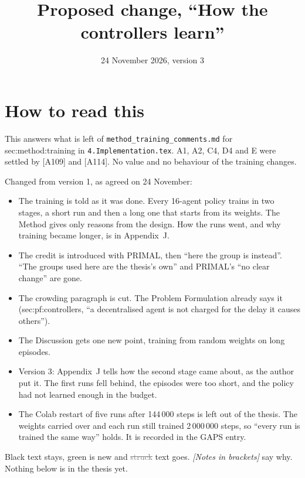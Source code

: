 \documentclass[11pt,a4paper]{article}
\title{Proposed change, ``How the controllers learn''}
\date{24 November 2026, version 3}
\newcommand{\new}[1]{\textcolor{newc}{#1}}
\newcommand{\old}[1]{\textcolor{gray}{\sout{#1}}}
\newcommand{\note}[1]{{\small\itshape [#1]}}
\newcommand{\lab}[1]{\textsf{\footnotesize #1}}
\begin{document}
\sloppy
\maketitle

\section*{How to read this}
This answers what is left of \texttt{method\_training\_comments.md} for
\lab{sec:method:training} in \texttt{4.Implementation.tex}. A1, A2, C4, D4
and E were settled by [A109] and [A114]. No value and no behaviour of the
training changes.

Changed from version 1, as agreed on 24 November:
\begin{itemize}[nosep]
  \item The training is told as it was done. Every 16-agent policy trains in
    two stages, a short run and then a long one that starts from its
    weights. The Method gives only reasons from the design. How the runs
    went, and why training became longer, is in Appendix~J.
  \item The credit is introduced with PRIMAL, then ``here the group is
    instead''. ``The groups used here are the thesis's own'' and PRIMAL's
    ``no clear change'' are gone.
  \item The crowding paragraph is cut. The Problem Formulation already says
    it (\lab{sec:pf:controllers}, ``a decentralised agent is not charged for
    the delay it causes others'').
  \item The Discussion gets one new point, training from random weights on
    long episodes.
  \item Version 3: Appendix~J tells how the second stage came about, as the
    author put it. The first runs fell behind, the episodes were too short,
    and the policy had not learned enough in the budget.
  \item The Colab restart of five runs after 144\,000 steps is left out of the
    thesis. The weights carried over and each run still trained
    2\,000\,000 steps, so ``every run is trained the same way'' holds. It is
    recorded in the GAPS entry.
\end{itemize}

Black text stays, \new{green} is new and \old{struck} text goes.
\note{Notes in brackets} say why. Nothing below is in the thesis yet.
\end{document}
